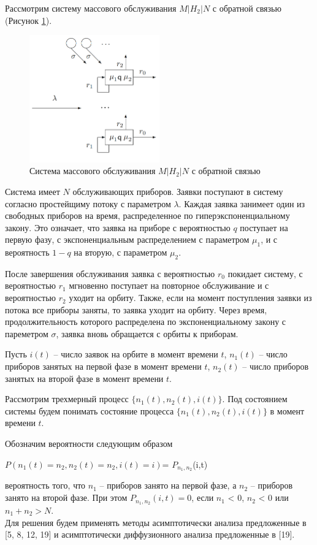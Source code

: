 Рассмотрим систему массового обслуживания $M|H_{2}|N$ с обратной связью (Рисунок \ref{fig:systemN}).

\begin{figure}[htbp]
	\centering
	\includegraphics[width=0.5\textwidth]{systemN}
	\caption{Система массового обслуживания $M|H_{2}|N$ с обратной связью}
	\label{fig:systemN}
\end{figure}


Система имеет $N$ обслуживающих приборов. Заявки поступают в систему согласно простейщиму потоку с параметром $\lambda$. Каждая заявка занимеет один из свободных приборов на время, распределенное по гиперэкспоненциальному закону. Это означает, что заявка на приборе с вероятностью $q$ поступает на первую фазу, с экспоненциальным распределением с параметром $\mu_{1}$, и с вероятность $1-q$ на вторую, с параметром $\mu_{2}$.

После завершения обслуживания заявка с вероятностью $r_{0}$ покидает систему, с вероятностью $r_{1}$ мгновенно поступает на повторное обслуживание и с вероятностью $r_{2}$ уходит на орбиту. Также, если на момент поступления заявки из потока все приборы заняты, то заявка уходит на орбиту. Через время, продолжительность которого распределена по экспоненциальному закону с пареметром $\sigma$, заявка вновь обращается с орбиты к приборам.

Пусть $i(t)$ -- число заявок на орбите в момент времени $t$, 
$n_{1}(t)$ -- число приборов занятых на первой фазе в момент времени $t$,
$n_{2}(t)$ -- число приборов занятых на второй фазе в момент времени $t$.

Рассмотрим трехмерный процесс $\{n_{1}(t), n_{2}(t), i(t)\}$. Под состоянием системы будем понимать состояние процесса $\{n_{1}(t), n_{2}(t), i(t)\}$ в момент времени $t$.

 Обозначим вероятности следующим образом \\
 \begin{center}
 	$P(n_{1}(t) = n_{2}, n_{2}(t)=n_{2}, i(t)=i)$= $P_{n_{1},n_{2}}$(i,t)\\
 \end{center}
вероятность того, что $n_{1}$ -- приборов занято на первой фазе, а $n_{2}$ -- приборов занято на второй фазе. При этом  $P_{n_{1},n_{2}}(i,t)=0$, если $n_{1}$ < 0, $n_{2}$ < 0 или $n_{1}+n_{2} > N.$\\

Для решения будем применять методы асимптотически анализа предложенные в [5, 8, 12, 19] и асимптотически диффузионного анализа предложенные в [19].

